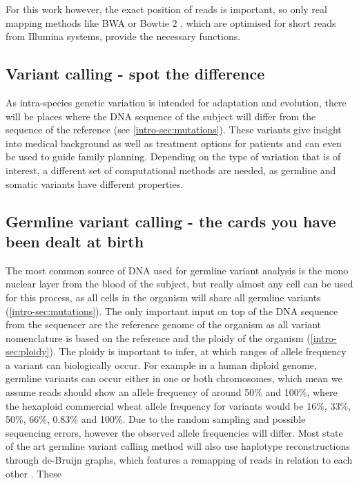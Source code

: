 For this work however, the exact position of reads is important, so only real mapping methods like BWA \cite{Li2013} or Bowtie 2 \cite{Langmead2018}, which are optimised for short reads from Illumina systems, provide the necessary functions.


\subsection[Variant calling]{Variant calling - spot the difference}
\label{intro-sec:variantcalling}
As intra-species genetic variation is intended for adaptation and evolution, there will be places where the DNA sequence of the subject will differ from the sequence of the reference (see \autoref{intro-sec:mutations}). These variants give insight into medical background as well as treatment options for patients and can even be used to guide family planning. Depending on the type of variation that is of interest, a different set of computational methods are needed, as germline and somatic variants have different properties.

\subsection[Germline]{Germline variant calling - the cards you have been dealt at birth}
\label{intro-sec:germlinecalling}
The most common source of DNA used for germline variant analysis is the mono nuclear layer from the blood of the subject, but really almost any cell can be used for this process, as all cells in the organism will share all germline variants (\autoref{intro-sec:mutations}). The only important input on top of the DNA sequence from the sequencer are the reference genome of the organism as all variant nomenclature is based on the reference and the ploidy of the organism (\autoref{intro-sec:ploidy}). The ploidy is important to infer, at which ranges of allele frequency a variant can biologically occur. For example in a human diploid genome, germline variants can occur either in one or both chromosomes, which mean we assume reads should show an allele frequency of around 50\% and 100\%, where the hexaploid commercial wheat \cite{Mayer2014} allele frequency for variants would be 16\%, 33\%, 50\%, 66\%, 0.83\% and 100\%. Due to the random sampling and possible sequencing errors, however the observed allele frequencies will differ. 
Most state of the art germline variant calling method will also use haplotype reconstructions through de-Bruijn graphs, which features a remapping of reads in relation to each other \cite{Garrison2012,Lai2016,Kim2018,Benjamin2019,Cooke2021}. These


